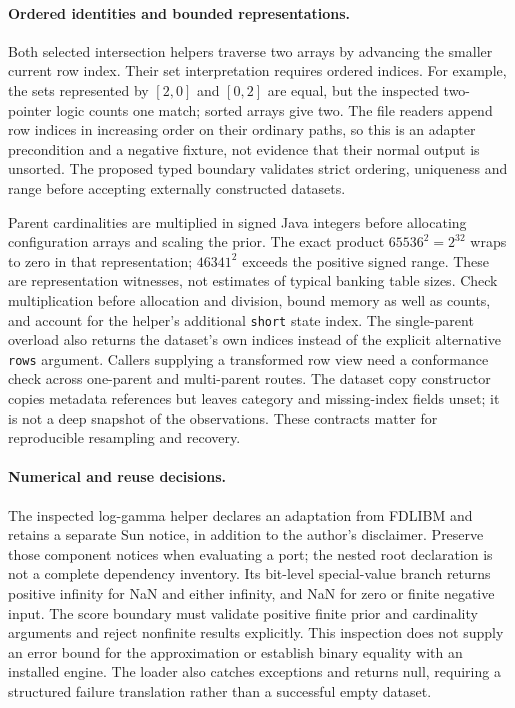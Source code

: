 \paragraph{Ordered identities and bounded representations.}
Both selected intersection helpers traverse two arrays by advancing the smaller
current row index. Their set interpretation requires ordered indices. For example,
the sets represented by \([2,0]\) and \([0,2]\) are equal, but the inspected
two-pointer logic counts one match; sorted arrays give two. The file readers append
row indices in increasing order on their ordinary paths, so this is an adapter
precondition and a negative fixture, not evidence that their normal output is
unsorted. The proposed typed boundary validates strict ordering, uniqueness and
range before accepting externally constructed datasets.~\citep{exec28_blip_helpers,exec28_blip_helper_reference}

Parent cardinalities are multiplied in signed Java integers before allocating
configuration arrays and scaling the prior. The exact product \(65536^2=2^{32}\)
wraps to zero in that representation; \(46341^2\) exceeds the positive signed
range. These are representation witnesses, not estimates of typical banking table
sizes. Check multiplication before allocation and division, bound memory as well
as counts, and account for the helper's additional \texttt{short} state index.
The single-parent overload also returns the dataset's own indices instead of the
explicit alternative \texttt{rows} argument. Callers supplying a transformed row
view need a conformance check across one-parent and multi-parent routes.
The dataset copy constructor copies metadata references but leaves category and
missing-index fields unset; it is not a deep snapshot of the observations.
These contracts matter for reproducible resampling and recovery.~\citep{exec28_blip_helpers,exec28_blip_helper_reference}

\paragraph{Numerical and reuse decisions.}
The inspected log-gamma helper declares an adaptation from FDLIBM and retains a
separate Sun notice, in addition to the author's disclaimer. Preserve those
component notices when evaluating a port; the nested root declaration is not a
complete dependency inventory. Its bit-level special-value branch returns positive
infinity for NaN and either infinity, and NaN for zero or finite negative input.
The score boundary must validate positive finite prior and cardinality arguments
and reject nonfinite results explicitly. This inspection does not supply an error
bound for the approximation or establish binary equality with an installed engine.
The loader also catches exceptions and returns null, requiring a structured failure
translation rather than a successful empty dataset.~\citep{exec28_blip_helpers}

